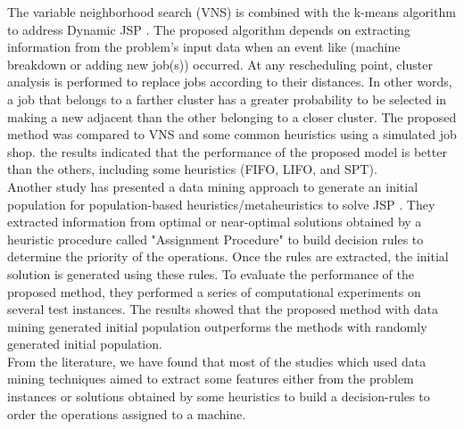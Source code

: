 \documentclass[runningheads]{llncs}
\begin{document}
The variable neighborhood search (VNS) is combined with the k-means algorithm to address Dynamic JSP \cite{adibi2014clustering}. The proposed algorithm depends on extracting information from the problem's input data when an event like (machine breakdown or adding new job(s)) occurred. At any rescheduling point, cluster analysis is performed to replace jobs according to their distances. In other words, a job that belongs to a farther cluster has a greater probability to be selected in making a new adjacent than the other belonging to a closer cluster. The proposed method was compared to VNS and some common heuristics using a simulated job shop. the results indicated that the performance of the proposed model is better than the others, including some heuristics (FIFO, LIFO, and SPT).\\

Another study has presented a data mining approach to generate an initial population for population-based heuristics/metaheuristics to solve JSP \cite{nasiri2019data}. They extracted information from optimal or near-optimal solutions obtained by a heuristic procedure called "Assignment Procedure" to build decision rules to determine the priority of the operations. Once the rules are extracted, the initial solution is generated using these rules. To evaluate the performance of the proposed method, they performed a series of computational experiments on several test instances. The results showed that the proposed method with data mining generated initial population outperforms the methods with randomly generated initial population.\\

From the literature, we have found that most of the studies which used data mining techniques aimed to extract some features either from the problem instances or solutions obtained by some heuristics to build a decision-rules to order the operations assigned to a machine.\\
\end{document}
